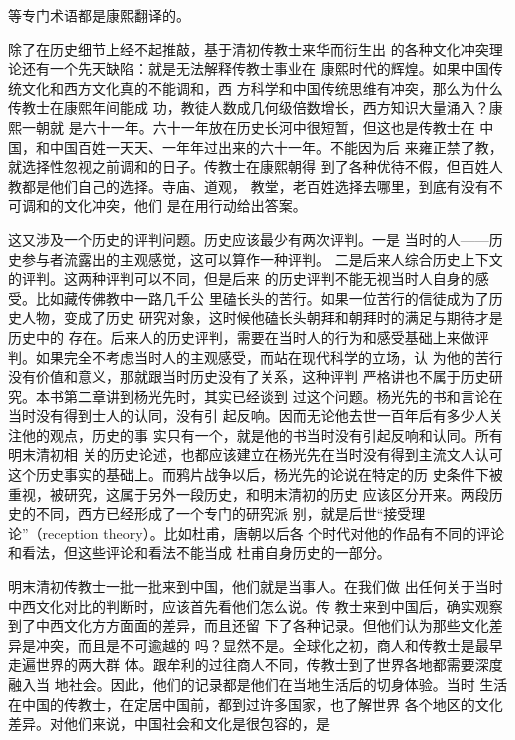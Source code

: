 等专门术语都是康熙翻译的。%
\par
除了在历史细节上经不起推敲，基于清初传教士来华而衍生出%
的各种文化冲突理论还有一个先天缺陷：就是无法解释传教士事业在%
康熙时代的辉煌。如果中国传统文化和西方文化真的不能调和，西%
方科学和中国传统思维有冲突，那么为什么传教士在康熙年间能成%
功，教徒人数成几何级倍数增长，西方知识大量涌入？康熙一朝就%
是六十一年。六十一年放在历史长河中很短暂，但这也是传教士在%
中国，和中国百姓一天天、一年年过出来的六十一年。不能因为后%
来雍正禁了教，就选择性忽视之前调和的日子。传教士在康熙朝得%
到了各种优待不假，但百姓人教都是他们自己的选择。寺庙、道观，%
教堂，老百姓选择去哪里，到底有没有不可调和的文化冲突，他们%
是在用行动给出答案。%
\par
这又涉及一个历史的评判问题。历史应该最少有两次评判。一是%
当时的人——历史参与者流露出的主观感觉，这可以算作一种评判。%
二是后来人综合历史上下文的评判。这两种评判可以不同，但是后来%
的历史评判不能无视当时人自身的感受。比如藏传佛教中一路几千公%
里磕长头的苦行。如果一位苦行的信徒成为了历史人物，变成了历史%
研究对象，这时候他磕长头朝拜和朝拜时的满足与期待才是历史中的%
存在。后来人的历史评判，需要在当时人的行为和感受基础上来做评%
判。如果完全不考虑当时人的主观感受，而站在现代科学的立场，认%
为他的苦行没有价值和意义，那就跟当时历史没有了关系，这种评判%
严格讲也不属于历史研究。本书第二章讲到杨光先时，其实已经谈到%
过这个问题。杨光先的书和言论在当时没有得到士人的认同，没有引%
起反响。因而无论他去世一百年后有多少人关注他的观点，历史的事%
实只有一个，就是他的书当时没有引起反响和认同。所有明末清初相%
关的历史论述，也都应该建立在杨光先在当时没有得到主流文人认可%
这个历史事实的基础上。而鸦片战争以后，杨光先的论说在特定的历%
史条件下被重视，被研究，这属于另外一段历史，和明末清初的历史%
应该区分开来。两段历史的不同，西方已经形成了一个专门的研究派%
别，就是后世“接受理论”（reception theory）。比如杜甫，唐朝以后各%
个时代对他的作品有不同的评论和看法，但这些评论和看法不能当成%
杜甫自身历史的一部分。%
\par
明末清初传教士一批一批来到中国，他们就是当事人。在我们做%
出任何关于当时中西文化对比的判断时，应该首先看他们怎么说。传%
教士来到中国后，确实观察到了中西文化方方面面的差异，而且还留%
下了各种记录。但他们认为那些文化差异是冲突，而且是不可逾越的%
吗？显然不是。全球化之初，商人和传教士是最早走遍世界的两大群%
体。跟牟利的过往商人不同，传教士到了世界各地都需要深度融入当%
地社会。因此，他们的记录都是他们在当地生活后的切身体验。当时%
生活在中国的传教士，在定居中国前，都到过许多国家，也了解世界%
各个地区的文化差异。对他们来说，中国社会和文化是很包容的，是%
